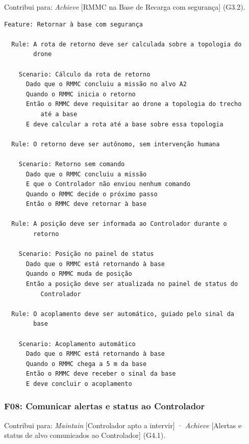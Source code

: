 \documentclass[a4paper, 12pt]{article}
\begin{document}
Contribui para: \textit{Achieve} [RMMC na Base de Recarga com segurança] (G3.2).

{\small
\begin{verbatim}
Feature: Retornar à base com segurança

  Rule: A rota de retorno deve ser calculada sobre a topologia do
        drone

    Scenario: Cálculo da rota de retorno
      Dado que o RMMC concluiu a missão no alvo A2
      Quando o RMMC inicia o retorno
      Então o RMMC deve requisitar ao drone a topologia do trecho
          até a base
      E deve calcular a rota até a base sobre essa topologia

  Rule: O retorno deve ser autônomo, sem intervenção humana

    Scenario: Retorno sem comando
      Dado que o RMMC concluiu a missão
      E que o Controlador não enviou nenhum comando
      Quando o RMMC decide o próximo passo
      Então o RMMC deve retornar à base

  Rule: A posição deve ser informada ao Controlador durante o
        retorno

    Scenario: Posição no painel de status
      Dado que o RMMC está retornando à base
      Quando o RMMC muda de posição
      Então a posição deve ser atualizada no painel de status do
          Controlador

  Rule: O acoplamento deve ser automático, guiado pelo sinal da
        base

    Scenario: Acoplamento automático
      Dado que o RMMC está retornando à base
      Quando o RMMC chega a 5 m da base
      Então o RMMC deve receber o sinal da base
      E deve concluir o acoplamento
\end{verbatim}
}

\Needspace{8cm}
\subsubsection{F08: Comunicar alertas e status ao Controlador}

Contribui para: \textit{Maintain} [Controlador apto a intervir] · \textit{Achieve} [Alertas e status de alvo comunicados ao Controlador] (G4.1).
\end{document}

